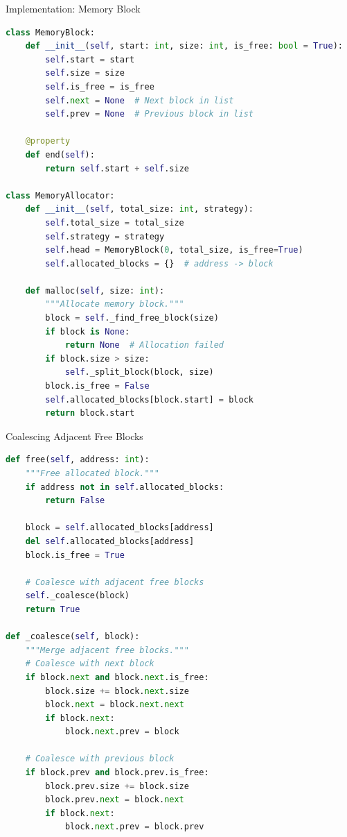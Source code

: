 \documentclass[aspectratio=169,xcolor=dvipsnames]{beamer}
\begin{document}
\begin{frame}[fragile]{Implementation: Memory Block}
\begin{lstlisting}[language=Python, basicstyle=\tiny\ttfamily]
class MemoryBlock:
    def __init__(self, start: int, size: int, is_free: bool = True):
        self.start = start
        self.size = size
        self.is_free = is_free
        self.next = None  # Next block in list
        self.prev = None  # Previous block in list

    @property
    def end(self):
        return self.start + self.size

class MemoryAllocator:
    def __init__(self, total_size: int, strategy):
        self.total_size = total_size
        self.strategy = strategy
        self.head = MemoryBlock(0, total_size, is_free=True)
        self.allocated_blocks = {}  # address -> block

    def malloc(self, size: int):
        """Allocate memory block."""
        block = self._find_free_block(size)
        if block is None:
            return None  # Allocation failed
        if block.size > size:
            self._split_block(block, size)
        block.is_free = False
        self.allocated_blocks[block.start] = block
        return block.start
\end{lstlisting}
\end{frame}

\begin{frame}[fragile]{Coalescing Adjacent Free Blocks}
\begin{lstlisting}[language=Python, basicstyle=\tiny\ttfamily]
def free(self, address: int):
    """Free allocated block."""
    if address not in self.allocated_blocks:
        return False

    block = self.allocated_blocks[address]
    del self.allocated_blocks[address]
    block.is_free = True

    # Coalesce with adjacent free blocks
    self._coalesce(block)
    return True

def _coalesce(self, block):
    """Merge adjacent free blocks."""
    # Coalesce with next block
    if block.next and block.next.is_free:
        block.size += block.next.size
        block.next = block.next.next
        if block.next:
            block.next.prev = block

    # Coalesce with previous block
    if block.prev and block.prev.is_free:
        block.prev.size += block.size
        block.prev.next = block.next
        if block.next:
            block.next.prev = block.prev
\end{lstlisting}
\end{frame}
\end{document}
